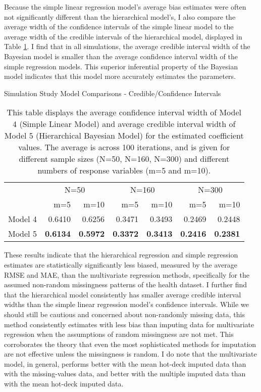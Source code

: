 Because the simple linear regression model's average bias estimates were often not significantly different than the hierarchical model's, I also compare the average width of the confidence intervals of the simple linear model to the average width of the credible intervals of the hierarchical model, displayed in Table \ref{symcompci}. I find that in all simulations, the average credible interval width of the Bayesian model is smaller than the average confidence interval width of the simple regression models. This superior inferential property of the Bayesian model indicates that this model more accurately estimates the parameters.

\begin{table}[htb]
\renewcommand\thetable{2.3}
       \footnotesize
    \centering
        \caption{Simulation Study Model Comparisons - Credible/Confidence Intervals}
    \begin{tabular}{l|r|r|r|r|r|r}
    & \multicolumn{2}{c}{N=50} & \multicolumn{2}{c}{N=160} & \multicolumn{2}{c}{N=300} \\
     & m=5 & m=10 & m=5 & m=10 & m=5 & m=10 \\
    \hline
    \hline
       Model 4 & 0.6410 & 0.6256 & 0.3471 & 0.3493 & 0.2469 & 0.2448 \\
      Model 5 & \textbf{0.6134} & \textbf{0.5972} & \textbf{0.3372} & \textbf{0.3413} & \textbf{0.2416} & \textbf{0.2381} \\
          \end{tabular}
    \label{symcompci}
    \caption{This table displays the average confidence interval width of Model 4 (Simple Linear Model) and average credible interval width of Model 5 (Hierarchical Bayesian Model) for the estimated coefficient values. The average is across 100 iterations, and is given for different sample sizes (N=50, N=160, N=300) and different numbers of response variables (m=5 and m=10).}
\end{table}

These results indicate that the hierarchical regression and simple regression estimates are statistically significantly less biased, measured by the average RMSE and MAE, than the multivariate regression methods, specifically for the assumed non-random missingness patterns of the health dataset. I further find that the hierarchical model consistently has smaller average credible interval widths than the simple linear regression model's confidence intervals. While we should still be cautious and concerned about non-randomly missing data, this method consistently estimates with less bias than imputing data for multivariate regression when the assumptions of random missingness are not met. This corroborates the theory that even the most sophisticated methods for imputation are not effective unless the missingness is random. I do note that the multivariate model, in general, performs better with the mean hot-deck imputed data than with the missing-values data, and better with the multiple imputed data than with the mean hot-deck imputed data.

